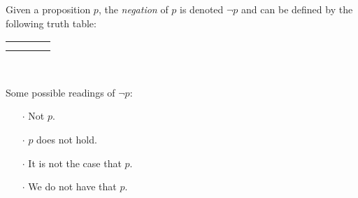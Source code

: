 \begin{definition}[Negation]
    \begin{center}
        \begin{minipage}[t]{.55\linewidth}
            Given a proposition \(p\), the \emph{negation} of \(p\)
            is denoted \(\neg p\) and can be defined by the following truth table:
            \begin{table}[H]
                \centering
                \label{tab:not}
                \begin{tabular}{|Cc||Cc|}
                    \hline
                     &  \\ \hline
                    \thead{\(\top\)} &  \\
                    \thead{\(\bot\)} &  \\ \hline
                \end{tabular}
            \end{table}
        \end{minipage}%
        \begin{minipage}[t]{.05\linewidth}
            ~
        \end{minipage}%
        \begin{minipage}[t]{.4\linewidth}
            Some possible readings of \(\neg p\):\\
            \begin{itemize}
                \item[\(\cdot\)]
                    Not \(p\).
                \item[\(\cdot\)]
                    \(p\) does not hold.
                \item[\(\cdot\)]
                    It is not the case that \(p\).
                \item[\(\cdot\)]
                    We do not have that \(p\).
            \end{itemize}
        \end{minipage}
    \end{center}
\end{definition}

